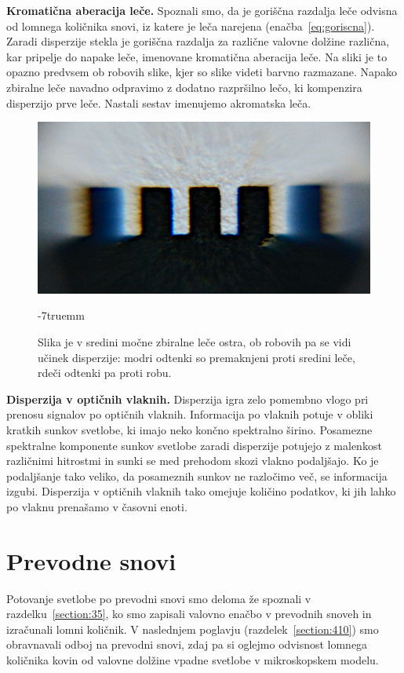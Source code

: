 \begin{example}{\bf Kromatična aberacija leče.}
Spoznali smo, da je goriščna razdalja leče odvisna
od lomnega količnika snovi, iz katere je leča narejena 
(enačba~\ref{eq:goriscna}). Zaradi disperzije stekla
je goriščna razdalja za različne valovne dolžine različna,
kar pripelje do napake leče, imenovane kromatična
aberacija leče. Na sliki je to opazno predvsem 
ob robovih slike, kjer so slike videti barvno razmazane. 
Napako zbiralne leče navadno odpravimo z dodatno razpršilno lečo, ki kompenzira
disperzijo prve leče. Nastali sestav imenujemo akromatska leča.
\begin{figure}[ht]
\centering
\includegraphics[width=8truecm]{slike/09_aberacija.jpg}
\caption{Slika je v sredini močne zbiralne leče ostra, ob robovih pa
se vidi učinek disperzije: modri odtenki so premaknjeni proti sredini 
leče, rdeči odtenki pa proti robu.}
\label{fig:09_aberacija}
\vglue-7truemm
\end{figure}

\end{example}

\begin{example}{\bf Disperzija v optičnih vlaknih.}
Disperzija igra zelo pomembno vlogo pri prenosu signalov
po optičnih vlaknih. Informacija po vlaknih potuje
v obliki kratkih sunkov svetlobe, ki imajo neko
končno spektralno širino. Posamezne spektralne 
komponente sunkov svetlobe zaradi disperzije 
potujejo z malenkost različnimi hitrostmi in sunki se 
med prehodom skozi vlakno podaljšajo. Ko je podaljšanje
tako veliko, da posameznih sunkov ne razločimo več, 
se informacija izgubi.  
Disperzija v optičnih vlaknih tako omejuje količino 
podatkov, ki jih lahko po vlaknu prenašamo v časovni enoti.
\end{example}

\section{Prevodne snovi}
Potovanje svetlobe po prevodni snovi smo deloma že spoznali v 
razdelku~\ref{section:35}, ko smo zapisali valovno enačbo 
v prevodnih snoveh in izračunali lomni količnik.
V naslednjem poglavju (razdelek~\ref{section:410}) 
smo obravnavali odboj na prevodni snovi, zdaj pa si oglejmo odvisnost
lomnega količnika kovin od valovne dolžine vpadne svetlobe v mikroskopskem
modelu.

